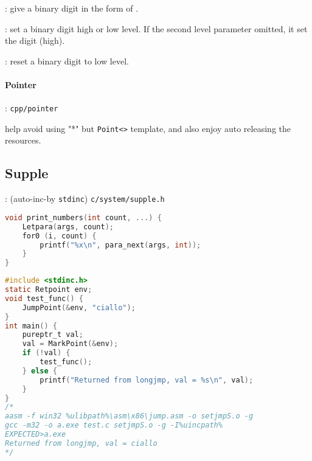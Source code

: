 : give a binary digit in the form of . 

: set a binary digit high or low level. If the second level parameter omitted, it set the digit (high).

: reset a binary digit to low level.

\paragraph{Pointer}

: \verb`cpp/pointer`

help avoid using "*" but \verb`Point<>` template, and also enjoy auto releasing the resources.

\subsection{Supple}

: (auto-inc-by \verb`stdinc`) \verb`c/system/supple.h`


\begin{lstlisting}[language=C]
void print_numbers(int count, ...) {
	Letpara(args, count);
	for0 (i, count) {
		printf("%x\n", para_next(args, int));
	}
}
\end{lstlisting}


\begin{lstlisting}[language=C]
#include <stdinc.h>
static Retpoint env;
void test_func() {
	JumpPoint(&env, "ciallo");
}
int main() {
	pureptr_t val;
	val = MarkPoint(&env);
	if (!val) {
		test_func();
	} else {
		printf("Returned from longjmp, val = %s\n", val);
	}
}
/*
aasm -f win32 %ulibpath%\asm\x86\jump.asm -o setjmpS.o -g
gcc -m32 -o a.exe test.c setjmpS.o -g -I%uincpath%
EXPECTED>a.exe
Returned from longjmp, val = ciallo
*/
\end{lstlisting}
